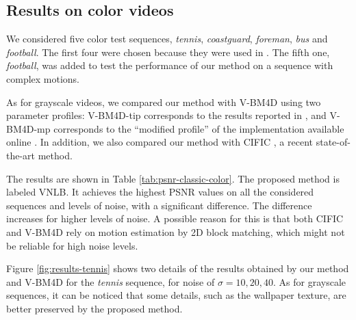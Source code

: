 \documentclass[10pt, a4paper]{article}
\begin{document}
\subsection{Results on color videos}

We considered five color test sequences, \emph{tennis}, \emph{coastguard},
\emph{foreman}, \emph{bus} and \emph{football}. The first four were chosen
because they were used in \cite{Maggioni2012}. The fifth one, \emph{football},
was added to test the performance of our method on a sequence with complex motions.

As for grayscale videos, we compared our method with V-BM4D using two parameter profiles:
V-BM4D-tip corresponds to the results reported in \cite{Maggioni2012}, and
V-BM4D-mp corresponds to the ``modified profile''
of the implementation available online \cite{bm4dcode}.
In addition, we also compared our method with CIFIC \cite{Dai2013}, a recent
state-of-the-art method.

The results are shown in Table \ref{tab:psnr-classic-color}. The proposed method is
labeled VNLB. It achieves the highest PSNR values on all the considered
sequences and levels of noise, with a significant difference. The difference
increases for higher levels of noise. A possible reason for this is that both 
CIFIC and V-BM4D rely on motion estimation by 2D block matching, which might
not be reliable for high noise levels.


Figure \ref{fig:results-tennis} 
shows two details of the results obtained by our method and V-BM4D for the
\emph{tennis} sequence, for noise of $\sigma = 10, 20, 40$. As for grayscale
sequences, it can be noticed that some details, such as the wallpaper texture,
are better preserved by the proposed method. 
\end{document}

